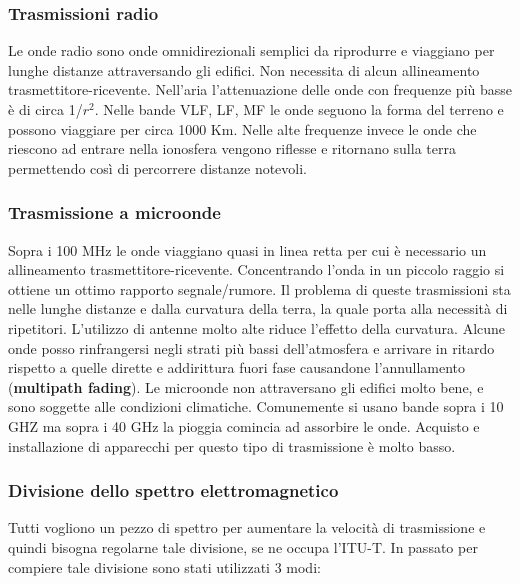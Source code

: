 \subsubsection{Trasmissioni radio}

Le onde radio sono onde omnidirezionali semplici da riprodurre e viaggiano per lunghe distanze attraversando gli edifici. Non necessita di alcun allineamento trasmettitore-ricevente. Nell'aria l'attenuazione delle onde con frequenze più basse è di circa 1/\(r^2\). Nelle bande VLF, LF, MF le onde seguono la forma del terreno e possono viaggiare per circa 1000 Km. Nelle alte frequenze invece le onde che riescono ad entrare nella ionosfera vengono riflesse e ritornano sulla terra permettendo così di percorrere distanze notevoli. 

\subsubsection{Trasmissione a microonde}

Sopra i 100 MHz le onde viaggiano quasi in linea retta per cui è necessario un allineamento trasmettitore-ricevente. Concentrando l'onda in un piccolo raggio si ottiene un ottimo rapporto segnale/rumore. Il problema di queste trasmissioni sta nelle lunghe distanze e dalla curvatura della terra, la quale porta alla necessità di ripetitori. L'utilizzo di antenne molto alte riduce l'effetto della curvatura. Alcune onde posso rinfrangersi negli strati più bassi dell'atmosfera e arrivare in ritardo rispetto a quelle dirette e addirittura fuori fase causandone l'annullamento (\textbf{multipath fading}). Le microonde non attraversano gli edifici molto bene, e sono soggette alle condizioni climatiche. Comunemente si usano bande sopra i 10 GHZ ma sopra i 40 GHz la pioggia comincia ad assorbire le onde. Acquisto e installazione di apparecchi per questo tipo di trasmissione è molto basso.

\subsubsection*{Divisione dello spettro elettromagnetico}

Tutti vogliono un pezzo di spettro per aumentare la velocità di trasmissione e quindi bisogna regolarne tale divisione, se ne occupa l'ITU-T. In passato per compiere tale divisione sono stati utilizzati 3 modi:

